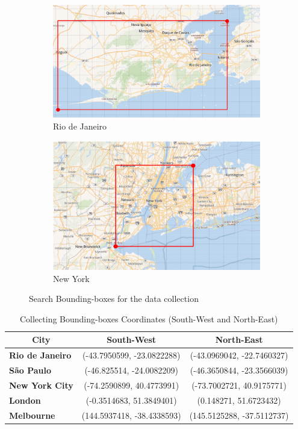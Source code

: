 \begin{figure}[t]
	\begin{subfigure}[t]{0.42\textwidth}
		\centering
		\includegraphics[width=1\linewidth]{figures/rio_bb.png}
		\caption{Rio de Janeiro}
		\label{fig:riodejaneiro_bounding_box}
	\end{subfigure}
	\quad
	\begin{subfigure}[t]{0.38\textwidth}
		\centering
		\includegraphics[width=1\linewidth]{figures/newyork_bb.png}
		\caption{New York}
		\label{fig:newyork_bounding_box}
	\end{subfigure}
	\caption{Search Bounding-boxes for the data collection}
	\label{fig:bounding_boxes}
\end{figure}

\begin{table}[b]
	\centering
	\setlength\extrarowheight{3pt}
	\caption{Collecting Bounding-boxes Coordinates (South-West and North-East)}
	\label{tab:bbs_points}
	\begin{tabular}{l|c|c}
		\hline
		\multicolumn{1}{c|}{\textbf{City}} & \textbf{South-West} & \textbf{North-East} \\ \hline
		\textbf{Rio de Janeiro} & (-43.7950599, -23.0822288) & (-43.0969042, -22.7460327) \\
		\textbf{São Paulo} & (-46.825514, -24.0082209) & (-46.3650844, -23.3566039) \\
		\textbf{New York City} & (-74.2590899, 40.4773991) & (-73.7002721, 40.9175771) \\
		\textbf{London} & (-0.3514683, 51.3849401) & (0.148271, 51.6723432) \\
		\textbf{Melbourne} & (144.5937418, -38.4338593) & (145.5125288, -37.5112737) \\ \hline
	\end{tabular}
\end{table}

